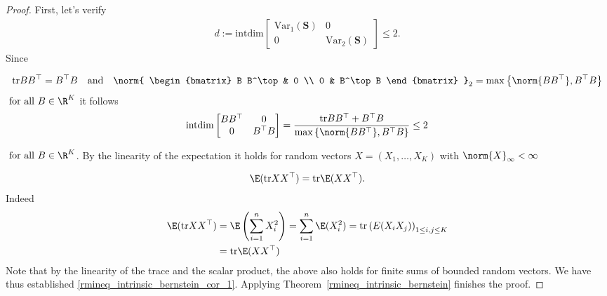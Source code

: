 \begin{proof}
  First, let's verify 
  \begin{gather}
   \label{rmineq_intrinsic_bernstein_cor_1}
    d
    :=
    \mathrm{intdim}
    \begin{bmatrix}
      \text{Var}_1(\mathbf{S}) & 0 \\
      0   & \text{Var}_2(\mathbf{S})
    \end{bmatrix}
    \le
    2
    .
  \end{gather}
  Since
 
  \begin{gather}
  \text{tr} 
  B B^\top 
  =
  B^\top B
  \quad
  \text{and}
  \quad
  \norm{
    \begin{bmatrix}
      B B^\top & 0 \\
      0   & B^\top B
    \end{bmatrix}
  }_2
  =
  \max
  \left\{ 
    \norm{B B^\top},
    B^\top B
  \right\}
  \end{gather}
  $
  \text{
  for all 
  }
  B \in \R^K
  $
  it follows
  \begin{align}
    \text{intdim} 
    \begin{bmatrix}
      B B^\top & 0 \\
      0   & B^\top B
    \end{bmatrix}
    =
  \frac{
    \text{tr}B B^\top
    +
    B^\top B
  }
  {
  \max
  \left\{ 
    \norm{B B^\top},
    B^\top B
  \right\}
  }
  \le
  2  
  \end{align}

$
  \text{
  for all 
  }
  B \in \R^K
$.
By the linearity of the expectation  
it holds
for random vectors 
$X=(X_1, \ldots, X_K)$
with
$\norm{X}_\infty < \infty$

\begin{gather}
  \E(\text{tr} X X^\top) 
  =
  \text{tr} \E (X X^\top). 
\end{gather}
Indeed
\begin{align*}
  \E(\text{tr} X X^\top) 
  &=
  \E \left( 
    \sum_{i = 1}^{n}
      X_i^2
  \right)
  =
  \sum_{i = 1}^{n}
    \E(
      X_i^2
    )  
  =
  \text{tr}\left( 
    E(X_i X_j)
  \right)_{1 \le i,j \le K}
  \\
  &=
  \text{tr}
    \E(X X^\top)
\end{align*}
Note that by the linearity of the trace and the scalar product, the above also holds for finite sums of bounded random vectors. 
We have thus established \eqref{rmineq_intrinsic_bernstein_cor_1}.
Applying Theorem~\ref{rmineq_intrinsic_bernstein}
finishes the proof.
\end{proof}
